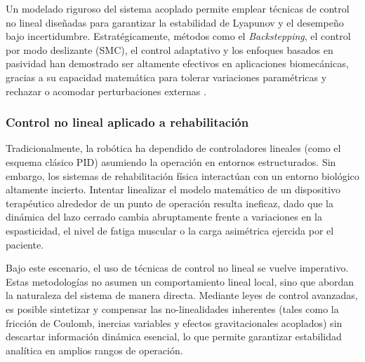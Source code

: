 \documentclass[a4paper,12pt]{article}
\begin{document}
Un modelado riguroso del sistema acoplado permite emplear técnicas de control no lineal diseñadas para garantizar la estabilidad de Lyapunov y el desempeño bajo incertidumbre. Estratégicamente, métodos como el \textit{Backstepping}, el control por modo deslizante (SMC), el control adaptativo y los enfoques basados en pasividad han demostrado ser altamente efectivos en aplicaciones biomecánicas, gracias a su capacidad matemática para tolerar variaciones paramétricas y rechazar o acomodar perturbaciones externas \citep{khalil2002nonlinear}.

\subsubsection{Control no lineal aplicado a rehabilitación}

Tradicionalmente, la robótica ha dependido de controladores lineales (como el esquema clásico PID) asumiendo la operación en entornos estructurados. Sin embargo, los sistemas de rehabilitación física interactúan con un entorno biológico altamente incierto. Intentar linealizar el modelo matemático de un dispositivo terapéutico alrededor de un punto de operación resulta ineficaz, dado que la dinámica del lazo cerrado cambia abruptamente frente a variaciones en la espasticidad, el nivel de fatiga muscular o la carga asimétrica ejercida por el paciente.

Bajo este escenario, el uso de técnicas de control no lineal se vuelve imperativo. Estas metodologías no asumen un comportamiento lineal local, sino que abordan la naturaleza del sistema de manera directa. Mediante leyes de control avanzadas, es posible sintetizar y compensar las no-linealidades inherentes (tales como la fricción de Coulomb, inercias variables y efectos gravitacionales acoplados) sin descartar información dinámica esencial, lo que permite garantizar estabilidad analítica en amplios rangos de operación. %
\end{document}
